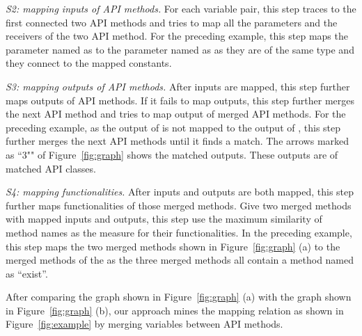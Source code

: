 \emph{S2: mapping inputs of API methods.} For each variable pair,
this step traces to the first connected two API methods and tries to
map all the parameters and the receivers of the two API method. For
the preceding example, this step maps the parameter named as
 to the parameter named as  as they
are of the same type and they connect to the mapped constants.

\emph{S3: mapping outputs of API methods.} After inputs are mapped,
this step further maps outputs of API methods. If it fails to map
outputs, this step further merges the next API method and tries to
map output of merged API methods. For the preceding example, as the
output of  is not mapped to the output
of , this step further merges the next
API methods until it finds a match. The arrows marked as ``3"" of
Figure~\ref{fig:graph} shows the matched outputs. These outputs are
of matched API classes.

\emph{S4: mapping functionalities.} After inputs and outputs are
both mapped, this step further maps functionalities of those merged
methods. Give two merged methods with mapped inputs and outputs,
this step use the maximum similarity of method names as the measure
for their functionalities. In the preceding example, this step maps
the two merged methods shown in Figure~\ref{fig:graph} (a) to the
merged methods of the  as the three
merged methods all contain a method named as ``exist''.

After comparing the graph shown in Figure~\ref{fig:graph} (a) with
the graph shown in Figure~\ref{fig:graph} (b), our approach mines
the mapping relation as shown in Figure~\ref{fig:example} by merging
variables between API methods.
